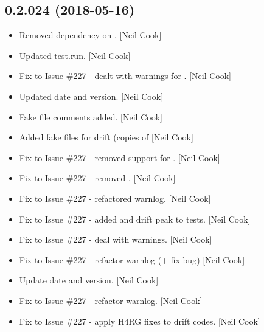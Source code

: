 \documentclass[a4paper,10pt,english]{report}
\begin{document}
\subsection{0.2.024 (2018-05-16)}
\label{\detokenize{misc/changelog:id437}}\begin{itemize}
\item {} 
Removed dependency on . {[}Neil Cook{]}

\item {} 
Updated test.run. {[}Neil Cook{]}

\item {} 
Fix to Issue \#227 - dealt with warnings for . {[}Neil Cook{]}

\item {} 
Updated date and version. {[}Neil Cook{]}

\item {} 
Fake file comments added. {[}Neil Cook{]}

\item {} 
Added fake  files for drift (copies of  {[}Neil Cook{]}

\item {} 
Fix to Issue \#227 - removed support for . {[}Neil
Cook{]}

\item {} 
Fix to Issue \#227 - removed . {[}Neil Cook{]}

\item {} 
Fix to Issue \#227 - refactored warnlog. {[}Neil Cook{]}

\item {} 
Fix to Issue \#227 - added  and drift peak to tests. {[}Neil
Cook{]}

\item {} 
Fix to Issue \#227 - deal with warnings. {[}Neil Cook{]}

\item {} 
Fix to Issue \#227 - refactor warnlog (+ fix bug) {[}Neil Cook{]}

\item {} 
Update date and version. {[}Neil Cook{]}

\item {} 
Fix to Issue \#227 - refactor warnlog. {[}Neil Cook{]}

\item {} 
Fix to Issue \#227 - apply H4RG fixes to drift codes. {[}Neil Cook{]}


\end{itemize}
\end{document}
